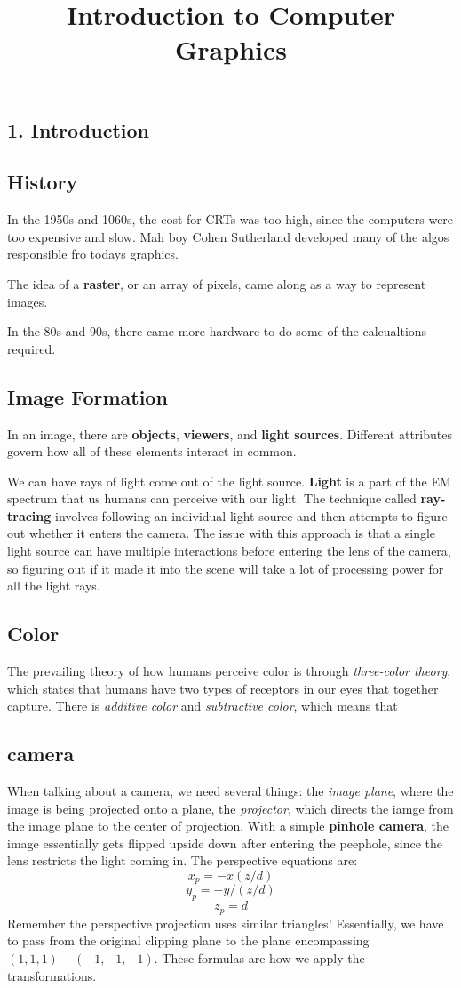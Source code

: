 \documentclass[portrait, 10pt, a4paper]{article}
\title{Introduction to Computer Graphics}
\begin{document}
\raggedright
\begin{multicols*}{3}
\section{1. Introduction}
	\subsection{History}
		In the 1950s and 1060s, the cost for CRTs was too high, since the computers were too expensive and slow.
		Mah boy Cohen Sutherland developed many of the algos responsible fro todays graphics.
		
		The idea of a \textbf{raster}, or an array of pixels, came along as a way to represent images.

		In the 80s and 90s, there came more hardware to do some of the calcualtions required.
	\subsection{Image Formation}
		In an image, there are \textbf{objects}, \textbf{viewers}, and \textbf{light sources}. Different attributes
		govern how all of these elements interact in common. 

		We can have rays of light come out of the light source. \textbf{Light} is a part of the EM spectrum that us
		humans can perceive with our light. The technique called \textbf{ray-tracing} involves following an individual
		light source and then attempts to figure out whether it enters the camera. The issue with this approach is that
		a single light source can have multiple interactions before entering the lens of the camera, so figuring out
		if it made it into the scene will take a lot of processing power for all the light rays.
	\subsection{Color}
		The prevailing theory of how humans perceive color is through \textit{three-color theory}, which states that 
		humans have two types of receptors in our eyes that together capture. There is \textit{additive color} and
		\textit{subtractive color}, which means that 
	\subsection{camera}
		When talking about a camera, we need several things: the \textit{image plane}, where the image is being 
		projected onto a plane, the \textit{projector}, which directs the iamge from the image plane to the 
		center of projection. With a simple \textbf{pinhole camera}, the image essentially gets flipped upside 
		down after entering the peephole, since the lens restricts the light coming in. The perspective equations
		are:
		\[ x_{p}=-x(z/d)\]
		\[ y_{p}=-y/(z/d)\]
		\[ z_{p}=d\]
		Remember the perspective projection uses similar triangles! Essentially, we have to pass from the original
		clipping plane to the plane encompassing $(1,1,1) - (-1,-1,-1)$. These formulas are how we apply the 
		transformations.

\end{multicols*}
\end{document}

